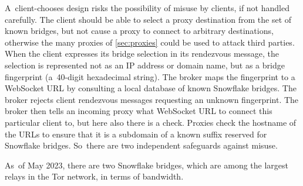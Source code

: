 \documentclass[letterpaper,twocolumn]{article}
\begin{document}
A~client-chooses design risks the possibility
of misuse by clients, if not handled carefully.
The client should be able to select
a proxy destination from the set of known bridges,
but not cause a proxy to connect to arbitrary destinations,
otherwise the many proxies of \autoref{sec:proxies}
could be used to attack third parties.
When the client expresses its bridge selection
in its rendezvous message, the selection is represented
not as an IP address or domain name,
but as a bridge fingerprint (a~\mbox{40-digit} hexadecimal string).
The broker maps the fingerprint to a WebSocket URL
by consulting a local database of known Snowflake bridges.
The broker rejects client rendezvous messages requesting an unknown fingerprint.
The broker then tells an incoming proxy
what WebSocket URL to connect this particular client to,
but here also there is a check.
Proxies check the hostname of the URLs
to ensure that it is a subdomain of a known suffix reserved for Snowflake bridges.
So~there are two independent safeguards against misuse.

As~of May 2023,
there are two Snowflake bridges,
which are among the largest relays in the Tor network,
in terms of bandwidth.

\end{document}
